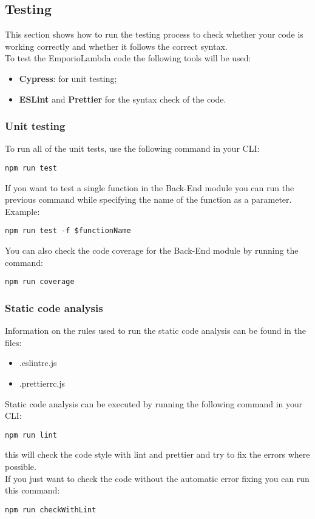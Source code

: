 \subsection{Testing}
This section shows how to run the testing process to check whether your code is working correctly and whether it follows the correct syntax. \\ 
To test the EmporioLambda code the following tools will be used:
\begin{itemize}
\item \textbf{Cypress}: for unit testing;
\item \textbf{ESLint} and \textbf{Prettier} for the syntax check of the code.
\end{itemize}

\subsubsection{Unit testing}
To run all of the unit tests, use the following command in your CLI:
\begin{center}
\texttt{npm run test}
\end{center}
If you want to test a single function in the Back-End module you can run the previous command while specifying the name of the function as a parameter.\\
Example:
\begin{center}
\texttt{npm run test -f \$functionName}
\end{center}
You can also check the code coverage for the Back-End module by running the command:
\begin{center}
\texttt{npm run coverage}
\end{center}

\subsubsection{Static code analysis}
Information on the rules used to run the static code analysis can be found in the files:
\begin{itemize}
\item .eslintrc.js
\item .prettierrc.js
\end{itemize}
Static code analysis can be executed by running the following command in your CLI:
\begin{center}
\texttt{npm run lint}
\end{center}
this will check the code style with lint and prettier and try to fix the errors where possible.\\ 
If you just want to check the code without the automatic error fixing you can run this command:
\begin{center}
\texttt{npm run checkWithLint}
\end{center}